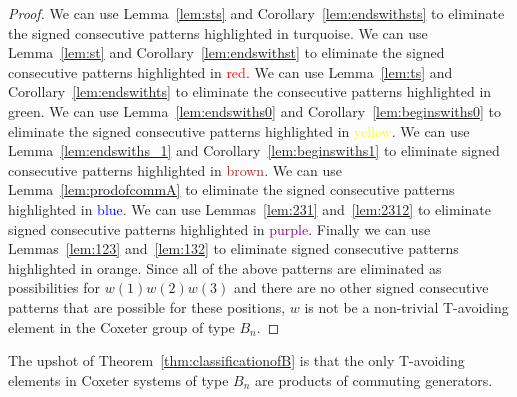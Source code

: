 \begin{theorem}
\begin{proof}
We can use Lemma~\ref{lem:sts} and Corollary~\ref{lem:endswithsts} to eliminate the signed consecutive patterns highlighted in \textcolor{turq}{turquoise}. We can use Lemma~\ref{lem:st} and Corollary~\ref{lem:endswithst} to eliminate the signed consecutive patterns highlighted in \textcolor{red}{red}. We can use Lemma~\ref{lem:ts} and Corollary~\ref{lem:endswithts} to eliminate the consecutive patterns highlighted in \textcolor{ggreen}{green}.  We can use Lemma~\ref{lem:endswiths0} and Corollary~\ref{lem:beginswiths0} to eliminate the signed consecutive patterns highlighted in \textcolor{yellow}{yellow}. We can use Lemma~\ref{lem:endswiths_1} and Corollary~\ref{lem:beginswiths1} to eliminate signed consecutive patterns highlighted in \textcolor{brown}{brown}. We can use Lemma~\ref{lem:prodofcommA} to eliminate the signed consecutive patterns highlighted in \textcolor{blue}{blue}. We can use Lemmas~\ref{lem:231} and~\ref{lem:2312} to eliminate signed consecutive patterns highlighted in \textcolor{purple}{purple}. Finally we can use Lemmas~\ref{lem:123} and~\ref{lem:132} to eliminate signed consecutive patterns highlighted in \textcolor{orange2}{orange}. Since all of the above patterns are eliminated as possibilities for $w(1)w(2)w(3)$ and there are no other signed consecutive patterns that are possible for these positions, $w$ is not be a non-trivial T-avoiding element in the Coxeter group of type $B_n$.
\end{proof}
\end{theorem}


The upshot of Theorem~\ref{thm:classificationofB} is that the only T-avoiding elements in Coxeter systems of type $B_n$ are products of commuting generators.
